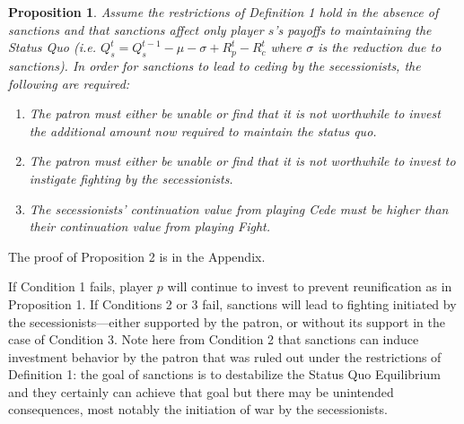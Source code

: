 \documentclass[11pt,letterpaper, notitlepage]{article}
\newtheorem{proposition}{Proposition}
\begin{document}

\begin{proposition}
Assume the restrictions of \emph{Definition 1} hold in the absence of sanctions and that sanctions affect only player $s$'s payoffs to maintaining the Status Quo (i.e. $Q_s^t = Q_s^{t-1} - \mu -\sigma +R_p^t - R_c^t$ where $\sigma$ is the reduction due to sanctions).  In order for sanctions to lead to ceding by the secessionists, the following are required:

\begin{enumerate}
\item \textit{The patron must either be unable or find that it is not worthwhile to invest the additional amount now required to maintain the status quo.}

\item \textit{The patron must either be unable or find that it is not worthwhile to invest to instigate fighting by the secessionists.}



\item \textit{The secessionists' continuation value from playing Cede must be higher than their continuation value from playing Fight.}
\end{enumerate}

\end{proposition}

The proof of Proposition 2 is in the Appendix.

If Condition 1 fails, player $p$ will continue to invest to prevent reunification as in Proposition 1. If Conditions 2 or 3 fail, sanctions will lead to fighting initiated by the secessionists---either supported by the patron, or without its support in the case of Condition 3. Note here from Condition 2 that sanctions can induce investment behavior by the patron that was ruled out under the restrictions of Definition 1: the goal of sanctions is to destabilize the Status Quo Equilibrium and they certainly can achieve that goal but there may be unintended consequences, most notably the initiation of war by the secessionists. 
\end{document}
